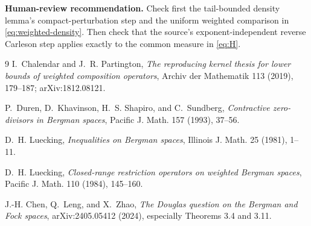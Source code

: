\documentclass[11pt]{article}
\begin{document}
\medskip
\noindent\textbf{Human-review recommendation.}
Check first the tail-bounded density lemma's compact-perturbation step and the
uniform weighted comparison in \eqref{eq:weighted-density}.  Then check that
the source's exponent-independent reverse Carleson step applies exactly to
the common measure in \eqref{eq:H}.

\begin{thebibliography}{9}
I.~Chalendar and J.~R. Partington,
\emph{The reproducing kernel thesis for lower bounds of weighted composition
operators}, Archiv der Mathematik 113 (2019), 179--187; arXiv:1812.08121.

P.~Duren, D.~Khavinson, H.~S. Shapiro, and C.~Sundberg,
\emph{Contractive zero-divisors in Bergman spaces},
Pacific J. Math. 157 (1993), 37--56.

D.~H. Luecking, \emph{Inequalities on Bergman spaces},
Illinois J. Math. 25 (1981), 1--11.

D.~H. Luecking, \emph{Closed-range restriction operators on weighted
Bergman spaces}, Pacific J. Math. 110 (1984), 145--160.

J.-H. Chen, Q.~Leng, and X.~Zhao,
\emph{The Douglas question on the Bergman and Fock spaces},
arXiv:2405.05412 (2024), especially Theorems 3.4 and 3.11.
\end{thebibliography}
\end{document}
